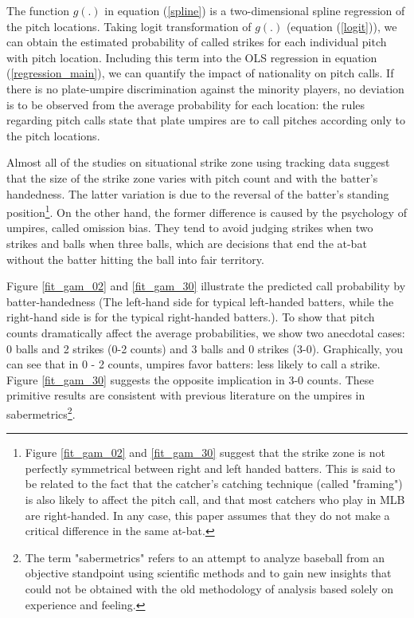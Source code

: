 \documentclass[dvipdfmx, 12pt]{jsarticle}
\begin{document}
The function $g(.)$ in equation (\ref{spline}) is a two-dimensional spline regression of the pitch locations. Taking logit transformation of $g(.)$ (equation (\ref{logit})), we can obtain the estimated probability of called strikes for each individual pitch with pitch location. Including this term into the OLS regression in equation (\ref{regression_main}), we can quantify the impact of nationality on pitch calls. If there is no plate-umpire discrimination against the minority players, no deviation is to be observed from the average probability for each location: the rules regarding pitch calls state that plate umpires are to call pitches according only to the pitch locations.

Almost all of the studies on situational strike zone using tracking data suggest that the size of the strike zone varies with pitch count and with the batter's handedness. The latter variation is due to the reversal of the batter's standing position\footnote{Figure \ref{fit_gam_02} and \ref{fit_gam_30} suggest that the strike zone is not perfectly symmetrical between right and left handed batters. This is said to be related to the fact that the catcher's catching technique (called "framing") is also likely to affect the pitch call, and that most catchers who play in MLB are right-handed. In any case, this paper assumes that they do not make a critical difference in the same at-bat.}. On the other hand, the former difference is caused by the psychology of umpires, called omission bias. They tend to avoid judging strikes when two strikes and balls when three balls, which are decisions that end the at-bat without the batter hitting the ball into fair territory.

Figure \ref{fit_gam_02} and \ref{fit_gam_30} illustrate the predicted call probability by batter-handedness (The left-hand side for typical left-handed batters, while the right-hand side is for the typical right-handed batters.). To show that pitch counts dramatically affect the average probabilities, we show two anecdotal cases: 0 balls and 2 strikes (0-2 counts) and 3 balls and 0 strikes (3-0). Graphically, you can see that in 0 - 2 counts, umpires favor batters: less likely to call a strike. Figure \ref{fit_gam_30} suggests the opposite implication in 3-0 counts. These primitive results are consistent with previous literature on the umpires in sabermetrics\footnote{The term "sabermetrics" refers to an attempt to analyze baseball from an objective standpoint using scientific methods and to gain new insights that could not be obtained with the old methodology of analysis based solely on experience and feeling.}.
\end{document}
